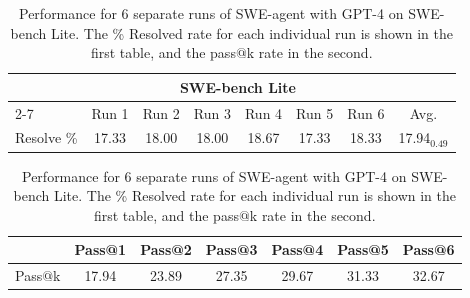 
\begin{table}[ht]
    \caption{
    Performance for 6 separate runs of SWE-agent with GPT-4 on SWE-bench Lite.
    The \% Resolved rate for each individual run is shown in the first table, and the pass$@$k rate in the second.
    }
    \label{tab:passk}
    \vspace{0.25em}
    \centering
    \begin{tabular}{lccccccc}
        \toprule
        & \multicolumn{6}{c}{SWE-bench Lite} \\
        \cmidrule(l){2-7}
        \multicolumn{1}{c}{} & Run 1 & Run 2 & Run 3 & Run 4 & Run 5 & Run 6 & Avg. \\
        \midrule
        Resolve \% & 17.33 & 18.00 & 18.00 & 18.67 & 17.33 & 18.33 & 17.94$_{0.49}$ \\
        \bottomrule
        \end{tabular}
        \vspace{1em}
        \begin{tabular}{lcccccc}
        \toprule
        \multicolumn{1}{c}{} & Pass@1 & Pass@2 & Pass@3 & Pass@4 & Pass@5 & Pass@6 \\
        \midrule
        Pass$@$k & 17.94 & 23.89 & 27.35 & 29.67 & 31.33 & 32.67 \\
        \bottomrule
    \end{tabular}
\end{table}
